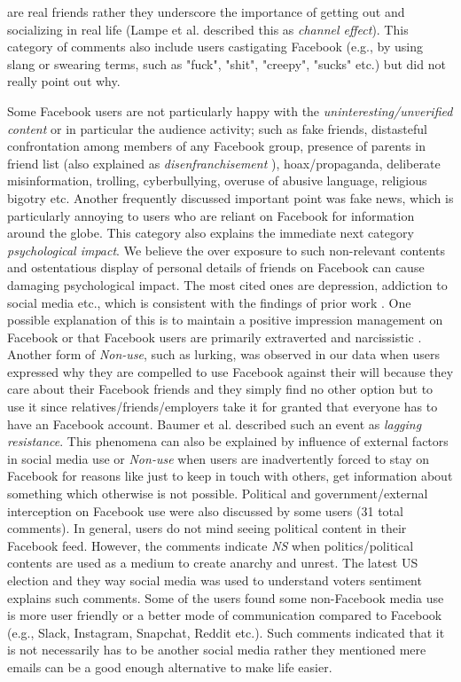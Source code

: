 are real friends rather they underscore the importance of getting out and socializing in real life (Lampe et al. \cite{lampe2013users} described this as \textit{channel effect}). This category of comments also include users castigating Facebook (e.g., by using slang or swearing terms, such as "fuck", "shit", "creepy", "sucks" etc.) but did not really point out why.  

Some Facebook users are not particularly happy with the \textit{uninteresting/unverified content} or in particular the audience activity; such as fake friends, distasteful confrontation among members of any Facebook group, presence of parents in friend list (also explained as \textit{disenfranchisement} \cite{satchell2009beyond}), hoax/propaganda, deliberate misinformation, trolling, cyberbullying, overuse of abusive language, religious bigotry etc. Another frequently discussed important point was fake news, which is particularly annoying to users who are reliant on Facebook for information around the globe. This category also explains the immediate next category \textit{psychological impact}. We believe the over exposure to such non-relevant contents and ostentatious display of personal details of friends on Facebook can cause damaging psychological impact. The most cited ones are depression, addiction to social media etc., which is consistent with the findings of prior work \cite{moreno2011feeling, christakis_2017}. One possible explanation of this is to maintain a positive impression management on Facebook \cite{rosenberg2011online} or that Facebook users are primarily extraverted and narcissistic \cite{ryan2011uses}. Another form of \textit{Non-use}, such as lurking, was observed in our data when users expressed why they are compelled to use Facebook against their will because they care about their Facebook friends and they simply find no other option but to use it since relatives/friends/employers take it for granted that everyone has to have an Facebook account. Baumer et al. \cite{baumer2013limiting} described such an event as \textit{lagging resistance}. This phenomena can also be explained by influence of external factors in social media use or \emph{Non-use} when users are inadvertently forced to stay on Facebook for reasons like just to keep in touch with others, get information about something which otherwise is not possible. Political and government/external interception on Facebook use were also discussed by some users (31 total comments). In general, users do not mind seeing political content in their Facebook feed. However, the comments indicate \emph{NS} when politics/political contents are used as a medium to create anarchy and unrest. The latest US election and they way social media was used to understand voters sentiment explains such comments. Some of the users found some non-Facebook media use is more user friendly or a better mode of communication compared to Facebook (e.g., Slack, Instagram, Snapchat, Reddit etc.). Such comments indicated that it is not necessarily has to be another social media rather they mentioned mere emails can be a good enough alternative to make life easier. 

